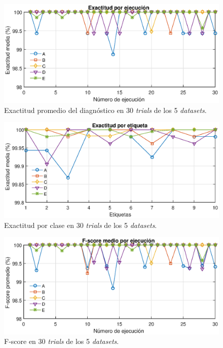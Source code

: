 \documentclass[12pt]{article}%
\begin{document}
\begin{figure}[ht]
  \centering
    \includegraphics[scale=0.9]{./AccG.eps}
  \caption{Exactitud promedio del diagnóstico en 30 \textit{trials} de los 5 \textit{datasets}.}
  \label{fig:exg}
\end{figure}

\begin{figure}[ht]
  \centering
    \includegraphics[scale=0.9]{./Acc.eps}
  \caption{Exactitud por clase en 30 \textit{trials} de los 5 \textit{datasets}.}
  \label{fig:exact}
\end{figure}

\begin{figure}[ht]
  \centering
    \includegraphics[scale=0.9]{./FscG.eps}
  \caption{F-score en 30 \textit{trials} de los 5 \textit{datasets}.}
  \label{fig:fscG}
\end{figure}
\end{document}
